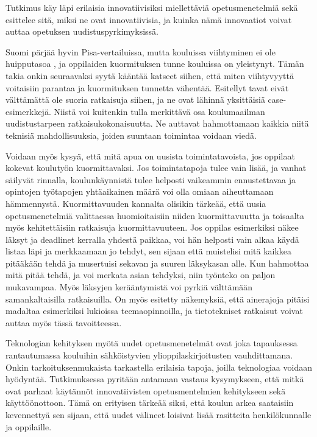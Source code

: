 \documentclass[utf8,bachelor]{gradu3}
\begin{document}
Tutkimus käy läpi erilaisia innovatiivisiksi miellettäviä opetusmenetelmiä sekä esittelee sitä, miksi ne ovat innovatiivisia, ja kuinka nämä innovaatiot voivat auttaa opetuksen uudistuspyrkimyksissä. %

Suomi pärjää hyvin Pisa-vertailuissa, mutta kouluissa viihtyminen ei ole huipputasoa \parencite[][]{kouluViihtyvyys}, ja oppilaiden kuormituksen tunne kouluissa on yleistynyt. \parencite [][]{oppilaidenKuormitus} Tämän takia onkin seuraavaksi syytä kääntää katseet siihen, että miten viihtyvyyttä voitaisiin parantaa ja kuormituksen tunnetta vähentää. Esitellyt tavat eivät välttämättä ole suoria ratkaisuja siihen, ja ne ovat lähinnä yksittäisiä case-esimerkkejä. Niistä voi kuitenkin tulla merkittävä osa koulumaailman uudistustarpeen ratkaisukokonaisuutta. Ne auttavat hahmottamaan kaikkia niitä teknisiä mahdollisuuksia, joiden suuntaan toimintaa voidaan viedä. 

Voidaan myös kysyä, että mitä apua on uusista toimintatavoista, jos oppilaat kokevat koulutyön kuormittavaksi. Jos toimintatapoja tulee vain lisää, ja vanhat säilyvät rinnalla, koulunkäynnistä tulee helposti vaikeammin ennustettavaa ja opintojen työtapojen yhtäaikainen määrä voi olla omiaan aiheuttamaan hämmennystä. Kuormittavuuden kannalta olisikin tärkeää, että uusia opetusmenetelmiä valittaessa huomioitaisiin niiden kuormittavuutta ja toisaalta myös kehitettäisiin ratkaisuja kuormittavuuteen. Jos oppilas esimerkiksi näkee läksyt ja deadlinet kerralla yhdestä paikkaa, voi hän helposti vain alkaa käydä listaa läpi ja merkkaamaan jo tehdyt, sen sijaan että muistelisi mitä kaikkea pitääkään tehdä ja musertuisi sekavan ja suuren läksykasan alle. Kun hahmottaa mitä pitää tehdä, ja voi merkata asian tehdyksi, niin työnteko on paljon mukavampaa. Myös läksyjen kerääntymistä voi pyrkiä välttämään samankaltaisilla ratkaisuilla. On myös esitetty näkemyksiä, että ainerajoja pitäisi madaltaa esimerkiksi lukioissa teemaopinnoilla, ja tietotekniset ratkaisut voivat auttaa myös tässä tavoitteessa. %


Teknologian kehityksen myötä uudet opetusmenetelmät ovat joka tapauksessa rantautumassa kouluihin sähköistyvien ylioppilaskirjoitusten vauhdittamana. Onkin tarkoituksenmukaista tarkastella erilaisia tapoja, joilla teknologiaa voidaan hyödyntää. Tutkimuksessa pyritään antamaan vastaus kysymykseen, että mitkä ovat parhaat käytännöt innovatiivisten opetusmentelmien kehitykseen sekä käyttöönottoon. Tämä on erityisen tärkeää siksi, että koulun arkea saataisiin kevennettyä sen sijaan, että uudet välineet loisivat lisää rasitteita henkilökunnalle ja oppilaille.
\end{document}
